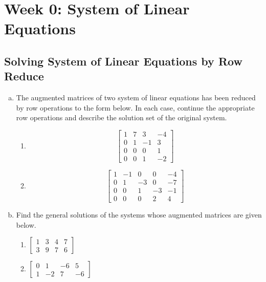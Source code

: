 \section{Week 0: System of Linear Equations}

\subsection{Solving System of Linear Equations by Row Reduce}
\begin{enumerate}[(a)]
    \item The augmented matrices of two system of linear equations has been reduced by row operations to the form below. In each case, continue the appropriate row operations and describe the solution set of the original system.
    \begin{enumerate}[i]
        \item
        $$
        \left[\begin{array}{rrr|r}
            1 & 7 & 3 & -4 \\
            0 & 1 & -1 & 3 \\
            0 & 0 & 0 & 1 \\
            0 & 0 & 1 & -2
        \end{array}\right]
        $$
        \item
        $$
        \left[\begin{array}{rrrr|r}
            1 & -1 & 0 & 0 & -4 \\
            0 & 1 & -3 & 0 & -7 \\
            0 & 0 & 1 & -3 & -1 \\
            0 & 0 & 0 & 2 & 4
        \end{array}\right]
        $$
    \end{enumerate}
    \item
    Find the general solutions of the systems whose augmented matrices are given below.
    \begin{enumerate}[i]
        \item
        $\left[\begin{array}{ccc|c}1 & 3 & 4 & 7 \\ 3 & 9 & 7 & 6\end{array}\right]$
        \item
        $\left[\begin{array}{rrr|r}0 & 1 & -6 & 5 \\ 1 & -2 & 7 & -6\end{array}\right]$
    \end{enumerate}
    
 \end{enumerate}   
